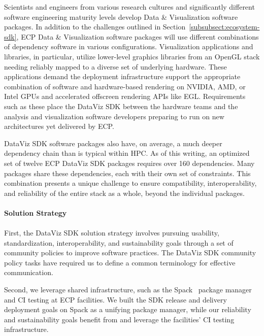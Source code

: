 Scientists and engineers from various research cultures and significantly different software engineering maturity levels develop Data \& Visualization software packages. In addition to the challenges outlined in Section~\ref{subsubsect:ecosystem-sdk}, ECP Data \& Visualization software packages will use different combinations of dependency software in various configurations. Visualization applications and libraries, in particular, utilize lower-level graphics libraries from an OpenGL stack needing reliably mapped to a diverse set of underlying hardware.  These applications demand the deployment infrastructure support the appropriate combination of software and hardware-based rendering on NVIDIA, AMD, or Intel GPUs and accelerated offscreen rendering APIs like EGL.  Requirements such as these place the DataViz SDK between the hardware teams and the analysis and visualization software developers preparing to run on new architectures yet delivered by ECP.

DataViz SDK software packages also have, on average, a much deeper dependency chain than is typical within HPC.  As of this writing, an optimized set of twelve ECP DataViz SDK packages requires over 160 dependencies.  Many packages share these dependencies, each with their own set of constraints.  This combination presents a unique challenge to ensure compatibility, interoperability, and reliability of the entire stack as a whole, beyond the individual packages.

\paragraph{\textbf{Solution Strategy}}
\paragraph{}

First, the DataViz SDK solution strategy involves pursuing usability, standardization, interoperability, and sustainability goals through a set of community policies to improve software practices. The DataViz SDK community policy tasks have required us to define a common terminology for effective communication.

Second, we leverage shared infrastructure, such as the Spack~\cite{gamblin+:sc15} package manager and CI testing at ECP facilities. We built the SDK release and delivery deployment goals on Spack as a unifying package manager, while our reliability and sustainability goals benefit from and leverage the facilities' CI testing infrastructure. 

